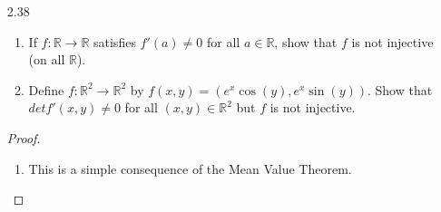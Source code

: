 \begin{enumerate}
\begin{proof}
\begin{enumerate}
        \item Let \( f:\mathbb{R}^n \rightarrow \mathbb{R}^m \), \( m < n \), be continuously differentiable. Suppose for contradiction that \( f \) is injective. If we define \( g: \mathbb{R}^n \rightarrow \mathbb{R}^n \) by 
        \[
        g(x_1,\ldots,x_n) = \left( x_1,x_2,\ldots,x_{n-m},f(x_1,\ldots,x_n) \right)
        \]
        then we know that
        \[
        g'(x) = \left[ \begin{array}{c|c} Id & 0 \\ \hline * & \frac{\partial f}{\partial \vec{y}}(x) \end{array} \right]
        \]
        where
        \[
       \frac{\partial f}{\partial \vec{y}}(x) = \begin{bmatrix} D_{n-m+1}f_1(x) & \ldots & D_{n}f_1(x) \\ \vdots & & \vdots \\ D_{n-m+1}f_m(x) & \ldots & D_nf_m(x) \end{bmatrix}
        \]
        and \( * \) is unimportant since  \( det g'(x) \neq 0 \) iff \( det \frac{\partial f}{\partial \vec{y}}(x) \neq 0 \). Now, if \( det \frac{\partial f}{\partial \vec{y}}(x) = 0 \) then there exists \( v \in \mathbb{R}^m \) such that \( v \neq 0 \) and
        \[
        \left[ \frac{\partial f}{\partial \vec{y}}(x)\right] v = 0
        \]
        which implies that if \( v^* \in \mathbb{R}^n \) admitting \( v^* = (0,\ldots,0,v) \) then we get that
        \[
        D_{v^*}f(x) = Df(x)(v^*) = \left[ \frac{\partial f}{\partial \vec{y}}(x)\right] v = \vec{0} \in \mathbb{R}^m
        \]
    \end{enumerate}
    \end{proof}
    
    \item[2.38]\begin{enumerate}
        \item If \( f: \mathbb{R} \rightarrow \mathbb{R} \) satisfies \( f'(a) \neq 0 \) for all \( a \in \mathbb{R} \), show that \( f \) is not injective (on all \( \mathbb{R} \)).
        
        \item Define \( f:\mathbb{R}^2 \rightarrow \mathbb{R}^2 \) by \( f(x,y) = (e^x \cos(y), e^x \sin(y)) \). Show that \( det f'(x,y) \neq 0 \) for all \( (x,y) \in \mathbb{R}^2 \) but \( f \) is not injective.
    \end{enumerate}
    
    \begin{proof}
    \begin{enumerate}
        \item This is a simple consequence of the Mean Value Theorem. 
        

\end{enumerate}
\end{proof}
\end{enumerate}
